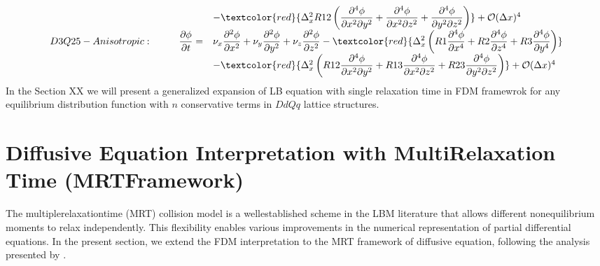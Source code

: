 \documentclass[letterpaper,10pt,english,openany,oneside]{jupyterBook}
\begin{document}
\begin{equation}
\begin{split}
\begin{array}{lll}
& &- \textcolor{red} { \Delta_{x}^{2} R12 \left( \displaystyle\frac{\partial^{4}\phi}{\partial x^{2}\partial y^{2}} + \frac{\partial^{4}\phi}{\partial x^{2}\partial z^{2}} + \frac{\partial^{4}\phi}{\partial y^{2}\partial z^{2}} \right) } + \mathcal{O}(\Delta x)^{4}\\
D3Q25-Anisotropic: \qquad & \displaystyle\frac{\partial\phi}{\partial t} =& \nu_{x} \displaystyle\frac{\partial^{2}\phi}{\partial x^{2}} + \nu_{y}\frac{\partial^{2}\phi}{\partial y^{2}} + \nu_{z}\frac{\partial^{2}\phi}{\partial z^{2}}  - \textcolor{red} { \Delta_{x}^{2} \left( R1\frac{\partial^{4}\phi}{\partial x^{4}} + R2\frac{\partial^{4}\phi}{\partial z^{4}} + R3\frac{\partial^{4}\phi}{\partial y^{4}} \right) } \\
& &- \textcolor{red} { \Delta_{x}^{2} \left( R12 \displaystyle\frac{\partial^{4}\phi}{\partial x^{2}\partial y^{2}} + R13\frac{\partial^{4}\phi}{\partial x^{2}\partial z^{2}} + R23\frac{\partial^{4}\phi}{\partial y^{2}\partial z^{2}} \right) } + \mathcal{O}(\Delta x)^{4}
\end{array}
\end{split}
\end{equation}
\sphinxAtStartPar
In the Section XX we will present a generalized expansion of LB equation with single relaxation time in FDM framewrok for any equilibrium distribution function with \(n\) conservative terms in \(DdQq\) lattice structures.


\section{Diffusive Equation Interpretation with Multi\sphinxhyphen{}Relaxation Time (MRT\sphinxhyphen{}Framework)}
\label{\detokenize{Refs/LBM-Study/FDM-Belloti/FDM-LBM-Diffusive:diffusive-equation-interpretation-with-multi-relaxation-time-mrt-framework}}
\sphinxAtStartPar
The multiple\sphinxhyphen{}relaxation\sphinxhyphen{}time (MRT) collision model is a well\sphinxhyphen{}established scheme in the LBM literature that allows different non\sphinxhyphen{}equilibrium moments to relax independently. This flexibility enables various improvements in the numerical representation of partial differential equations. In the present section, we extend the FDM interpretation to the MRT framework of diffusive equation, following the analysis presented by .
\end{document}

